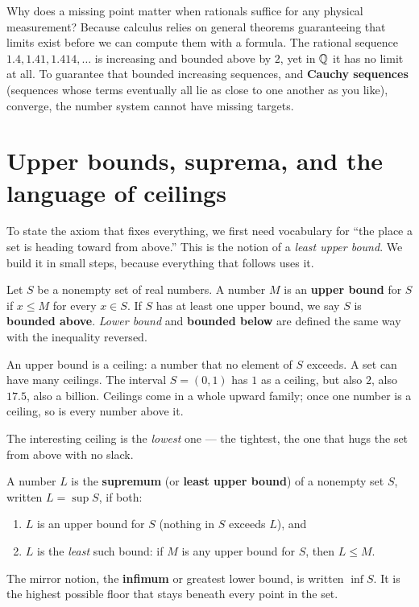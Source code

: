 \begin{whybox}
Why does a missing point matter when rationals suffice for any physical
measurement? Because calculus relies on general theorems guaranteeing that limits
exist before we can compute them with a formula. The rational sequence
$1.4, 1.41, 1.414, \ldots$ is increasing and bounded above by $2$, yet in
$\mathbb{Q}$ it has no limit at all. To guarantee that bounded increasing sequences, and
\textbf{Cauchy sequences} (sequences whose terms eventually all lie as close to one
another as you like), converge, the number system cannot have missing targets.
\end{whybox}

\section{Upper bounds, suprema, and the language of ceilings}
\label{ch41:sup}

To state the axiom that fixes everything, we first need vocabulary for ``the place a set
is heading toward from above.'' This is the notion of a \emph{least upper bound}. We build
it in small steps, because everything that follows uses it.

\begin{definition}
\label{ch41:def-bounded}
Let $S$ be a nonempty set of real numbers. A number $M$ is an \textbf{upper bound} for
$S$ if $x \le M$ for every $x \in S$. If $S$ has at least one upper bound, we say $S$ is
\textbf{bounded above}. \emph{Lower bound} and \textbf{bounded below} are defined the same
way with the inequality reversed.
\end{definition}

An upper bound is a ceiling: a number that no element of $S$ exceeds. A set can have many
ceilings. The interval $S = (0,1)$ has $1$ as a ceiling, but also $2$, also $17.5$, also a
billion. Ceilings come in a whole upward family; once one number is a ceiling, so is every
number above it.

The interesting ceiling is the \emph{lowest} one --- the tightest, the one that hugs the
set from above with no slack.

\begin{definition}
\label{ch41:def-sup}
A number $L$ is the \textbf{supremum} (or \textbf{least upper bound}) of a nonempty set
$S$, written $L = \sup S$, if both:
\begin{enumerate}
  \item $L$ is an upper bound for $S$ (nothing in $S$ exceeds $L$), and
  \item $L$ is the \emph{least} such bound: if $M$ is any upper bound for $S$, then
        $L \le M$.
\end{enumerate}
The mirror notion, the \textbf{infimum} or greatest lower bound, is written $\inf S$.
It is the highest possible floor that stays beneath every point in the set.
\end{definition}


